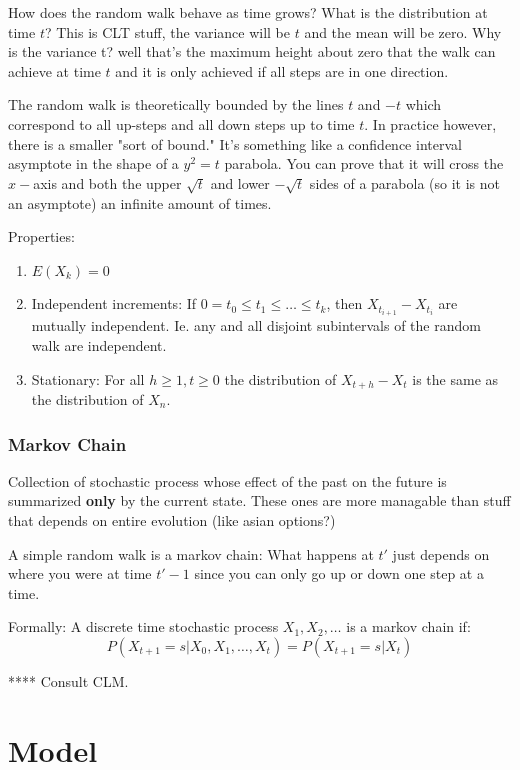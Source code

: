 \documentclass{article}
\begin{document}
How does the random walk behave as time grows?
What is the distribution at time $t$? This is CLT stuff, the variance will be $t$ and the mean will be zero. Why is the variance t? well that's the maximum height about zero that the walk can achieve at time $t$ and it is only achieved if all steps are in one direction. 


The random walk is theoretically bounded by the lines $t$ and $-t$ which correspond to all up-steps and all down steps up to time $t$. In practice however, there is a smaller "sort of bound." It's something like a confidence interval asymptote in the shape of a $y^2 = t$ parabola. You can prove that it will cross the $x-$axis and both the  upper $\sqrt{t}$ and lower $-\sqrt{t}$ sides of a parabola (so it is not an asymptote) an infinite amount of times. 

Properties: 
\begin{enumerate}
\item $E(X_k) = 0$
\item Independent increments: If $0=t_0 \leq t_1 \leq \dots \leq t_k$, then $X_{t_{i+1}} -X_{t_i}$ are mutually independent. Ie. any and all disjoint subintervals of the random walk are independent. 
\item Stationary: For all $h \geq 1, t \geq 0$ the distribution of $X_{t+h}-X_t$ is the same as the distribution of $X_n$.
\end{enumerate}

\subsubsection{Markov Chain}
Collection of stochastic process whose effect of the past on the future is summarized \textbf{only} by the current state. These ones are more managable than stuff that depends on entire evolution (like asian options?)

A simple random walk is a markov chain: What happens at $t'$ just depends on where you were at time $t'-1$ since you can only go up or down one step at a time. 

Formally: A discrete time stochastic process $X_1, X_2, \dots$ is a markov chain if: 
\[ P(X_{t+1}=s | X_0, X_1, \dots , X_t) = P(X_{t+1}=s | X_t)\] 


**** Consult CLM. 


\section{Model}
\end{document}
